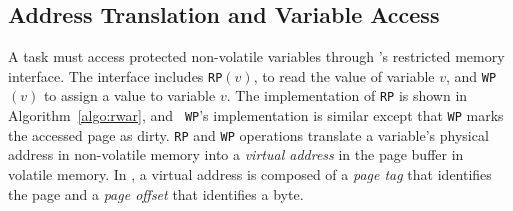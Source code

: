 \subsection{Address Translation and Variable Access}

A task must access protected non-volatile variables through \sys's
restricted memory interface. The interface includes \texttt{RP}$(v)$, to read the value of variable
$v$, and \texttt{WP}$(v)$ to assign a value to variable $v$. The
implementation of {\tt RP} is shown in Algorithm~\ref{algo:rwar}, and {\tt
WP}'s implementation is similar except that {\tt WP} marks the accessed page as
dirty.
%
{\tt RP} and {\tt WP} operations translate a variable's physical address in
non-volatile memory into a \emph{virtual address} in the page buffer in
volatile memory. In \sys, a virtual address is composed of a \emph{page tag}
that identifies the page and a \emph{page offset} that identifies a byte.


\begin{figure} %
\end{figure}

